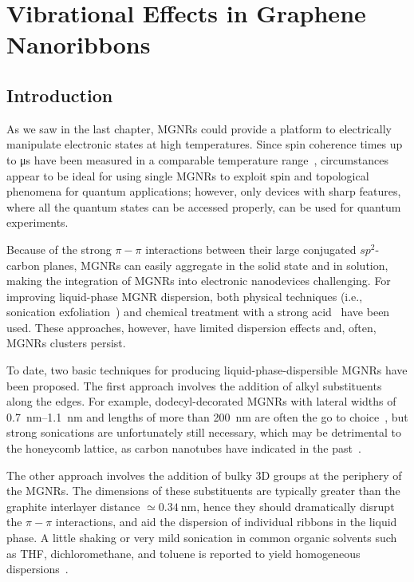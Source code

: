 \chapter{\label{ch:solubility} Vibrational Effects in Graphene Nanoribbons}

\minitoc

\section{Introduction}\label{solubility:sec:intro}

As we saw in the last chapter, \glspl{MGNR} could provide a platform to electrically manipulate electronic states at high temperatures. Since spin coherence times up to \si{\micro\second} have been measured in a comparable temperature range~\cite{slota2018magnetic,lombardi2019quantum}, circumstances appear to be ideal for using single \glspl{MGNR} to exploit spin and topological phenomena for quantum applications; however, only devices with sharp features, where all the quantum states can be accessed properly, can be used for quantum experiments.

Because of the strong $\pi-\pi$ interactions between their large conjugated $sp^2$-carbon planes, \glspl{MGNR} can easily aggregate in the solid state and in solution, making the integration of \glspl{MGNR} into electronic nanodevices challenging. For improving liquid-phase \gls{MGNR} dispersion, both physical techniques (i.e., sonication exfoliation~\cite{wang2008room}) and chemical treatment with a strong acid~\cite{shekhirev2017interfacial} have been used. These approaches, however, have limited dispersion effects and, often, \glspl{MGNR} clusters persist.

To date, two basic techniques for producing liquid-phase-dispersible \glspl{MGNR} have been proposed. The first approach involves the addition of alkyl substituents along the edges. For example, dodecyl-decorated \glspl{MGNR} with lateral widths of \SIrange{0.7}{1.1}{\nano\metre} and lengths of more than \SI{200}{\nano\metre} are often the go to choice~\cite{narita2014synthesis}, but strong sonications are unfortunately still necessary, which may be detrimental to the honeycomb lattice, as carbon nanotubes have indicated in the past~\cite{ham2005explanation, vaisman2006role}.

The other approach involves the addition of bulky 3D groups at the periphery of the \glspl{MGNR}. The dimensions of these substituents are typically greater than the graphite interlayer distance $\simeq\SI{0.34}{\nano\metre}$, hence they should dramatically disrupt the $\pi-\pi$ interactions, and aid the dispersion of individual ribbons in the liquid phase. A little shaking or very mild sonication in common organic solvents such as THF, dichloromethane, and toluene is reported to yield homogeneous dispersions~\cite{huang2018intrinsic}.

